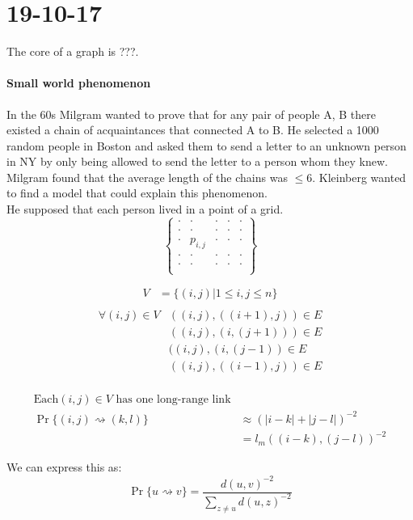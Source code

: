 \documentclass[]{article}
\begin{document}
\section{19-10-17}
The core of a graph is ???.%

\paragraph{Small world phenomenon}
In the 60s Milgram wanted to prove that for any pair of people A, B there existed a chain of acquaintances that connected A to B. He selected a 1000 random people in Boston and asked them to send a letter to an unknown person in NY by only being allowed to send the letter to a person whom they knew. Milgram found that the average length of the chains was $\leq 6$. Kleinberg wanted to find a model that could explain this phenomenon.\\
He supposed that each person lived in a point of a grid.
\[
\begin{Bmatrix}
\cdot & \cdot &\cdot &\cdot &\cdot\\
\cdot & \cdot &\cdot &\cdot &\cdot\\
\cdot & p_{i,j} &\cdot &\cdot &\cdot\\
\cdot & \cdot &\cdot &\cdot &\cdot\\
\cdot & \cdot &\cdot &\cdot &\cdot\\
\end{Bmatrix}\]

\begin{align*}
	V &=\{(i,j) | 1\leq i,j\leq n\}\\
\end{align*}
\begin{align*}
	\forall (i, j) \in V & ((i,j), ((i+1),j)) \in E\\
						 & ((i,j), (i,(j+1))) \in E\\
						 & ((i,j), (i,(j-1)) \in E\\
						 & ((i,j), ((i-1),j)) \in E\\
\end{align*}

\begin{align*}
\text{Each} (i,j) \in V \text{ has one long-range link}\\
\Pr\{(i,j)\rightsquigarrow (k,l)\} &\approx (|i-k|+|j-l|)^{-2}\\
&= l_m((i-k),(j-l))^{-2}
\end{align*}

We can express this as:
\[
\Pr\{u \rightsquigarrow v\} = \frac{d(u,v)^{-2}}{\sum_{z\neq u}^{}d(u,z)^{-2}}
\]
\end{document}
